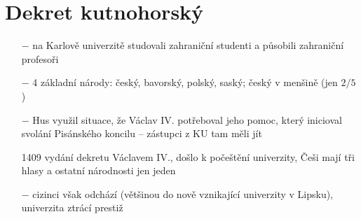 \documentclass{article}
\begin{document}
\section*{Dekret kutnohorský}
\begin{itemize}
    \vspace{-0.5em}
    \setlength\itemsep{0.15em}
    \item[$-$] na Karlově univerzitě studovali zahraniční studenti a působili zahraniční profesoři
    \item[$-$] 4 základní národy: český, bavorský, polský, saský; český v menšině (jen $2/5$)
    \item[$-$] Hus využil situace, že Václav IV. potřeboval jeho pomoc, který inicioval svolání Pisánského koncilu -- zástupci z KU tam měli jít
    \item[1409] vydání dekretu Václavem IV., došlo k počeštění univerzity, Češi mají tři hlasy a ostatní národnosti jen jeden
    \item[$-$] cizinci však odchází (většinou do nově vznikající univerzity v Lipsku), univerzita ztrácí prestiž
\end{itemize}
\end{document}
